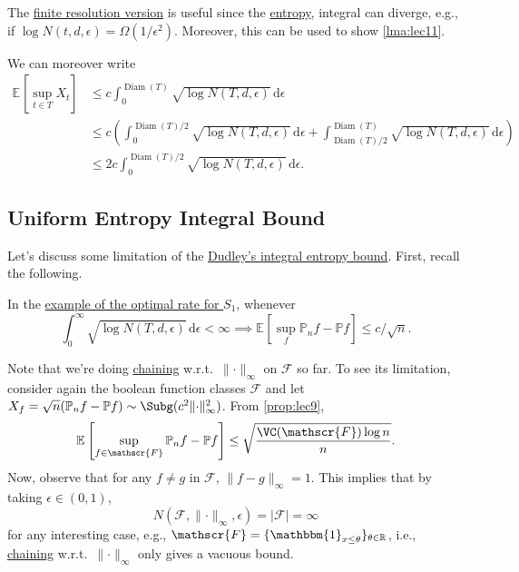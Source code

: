 The \hyperref[col:Dudley-integral-entropy-bound-finite-resolution]{finite resolution version} is useful since the \hyperref[def:metric-entropy]{entropy}, integral can diverge, e.g., if \(\log N(t, d, \epsilon ) = \Omega (1 / \epsilon ^2)\). Moreover, this can be used to show \autoref{lma:lec11}.

\begin{remark}
	We can moreover write
	\[
		\begin{split}
			\mathbb{E}_{}\left[\sup _{t\in T} X_t \right]
			&\leq c \int_{0}^{\mathop{\mathrm{Diam}}(T) } \sqrt{\log N(T, d, \epsilon )}  \,\mathrm{d}\epsilon \\
			&\leq c \left( \int_{0}^{\mathop{\mathrm{Diam}}(T) / 2} \sqrt{\log N(T, d, \epsilon )}  \,\mathrm{d}\epsilon + \int_{\mathop{\mathrm{Diam}}(T) / 2}^{\mathop{\mathrm{Diam}}(T) } \sqrt{\log N(T, d, \epsilon )} \,\mathrm{d}\epsilon \right) \\
			&\leq 2c \int_{0}^{\mathop{\mathrm{Diam}}(T) / 2} \sqrt{\log N(T, d, \epsilon )} \,\mathrm{d}\epsilon .
		\end{split}
	\]
\end{remark}

\subsection{Uniform Entropy Integral Bound}
Let's discuss some limitation of the \hyperref[col:Dudley-integral-entropy-bound]{Dudley's integral entropy bound}. First, recall the following.

\begin{prev}
	In the \hyperref[eg:optimal-EP-supremum-S1]{example of the optimal rate for \(S_1\)}, whenever
	\[
		\int_{0}^{\infty} \sqrt{\log N(T, d, \epsilon )} \,\mathrm{d}\epsilon < \infty
		\implies \mathbb{E}_{}\left[\sup _f \mathbb{P} _n f - \mathbb{P} f \right] \leq c / \sqrt{n}.
	\]
\end{prev}

Note that we're doing \hyperref[note:chaining]{chaining} w.r.t.\ \(\lVert \cdot \rVert _\infty \) on \(\mathscr{F} \) so far. To see its limitation, consider again the boolean function classes \(\mathscr{F} \) and let \(X_f = \sqrt{n} (\mathbb{P} _n f - \mathbb{P} f) \sim \Subg (c^2 \lVert \cdot \rVert ^2_\infty )\). From \autoref{prop:lec9},
\[
	\mathbb{E}_{}\left[\sup _{f\in \mathscr{F} } \mathbb{P} _n f - \mathbb{P} f \right]
	\leq \sqrt{\frac{\VC(\mathscr{F} ) \log n }{n}}.
\]
Now, observe that for any \(f \neq g\) in \(\mathscr{F} \), \(\lVert f - g \rVert _\infty = 1\). This implies that by taking \(\epsilon \in (0, 1)\),
\[
	N(\mathscr{F} , \lVert \cdot \rVert _\infty , \epsilon ) = \vert \mathscr{F} \vert = \infty
\]
for any interesting case, e.g., \(\mathscr{F} = \{ \mathbbm{1}_{x \leq \theta } \}_{\theta \in \mathbb{R}} \), i.e., \hyperref[note:chaining]{chaining} w.r.t.\ \(\lVert \cdot \rVert _\infty \) only gives a vacuous bound.


